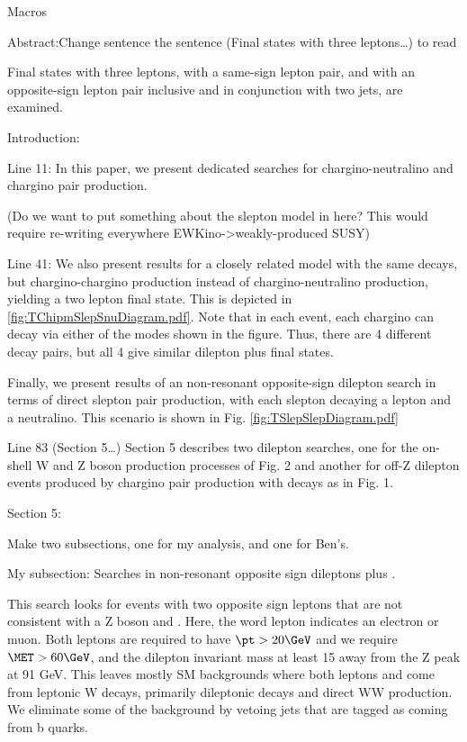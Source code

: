 Macros
\newcommand{\mctp}{\ensuremath{M_{\mathrm{CT}\perp}}}

Abstract:Change sentence the sentence (Final states with three leptons…) to read

Final states with three leptons, with a same-sign lepton pair, and with an opposite-sign lepton pair inclusive and in conjunction with two jets, are examined.

Introduction:

Line 11: In this paper, we present dedicated searches for chargino-neutralino and chargino pair production.

(Do we want to put something about the slepton model in here? This would require re-writing everywhere EWKino->weakly-produced SUSY)

Line 41: We also present results for a closely related model with the same decays, but chargino-chargino production instead of chargino-neutralino production, yielding a two lepton final state. This is depicted in \ref{fig:TChipmSlepSnuDiagram.pdf}. Note that in each event, each chargino can decay via either of the modes shown in the figure. Thus, there are 4 different decay pairs, but all 4 give similar dilepton plus \MET final states.

Finally, we present results of an non-resonant opposite-sign dilepton search in terms of direct slepton pair production, with each slepton decaying a lepton and a neutralino. This scenario is shown in Fig. \ref{fig:TSlepSlepDiagram.pdf}

Line 83 (Section 5…) Section 5 describes two dilepton searches, one for the on-shell W and Z boson production processes of Fig. 2 and another for off-Z dilepton events produced by chargino pair production with decays as in Fig. 1.

Section 5:

Make two subsections, one for my analysis, and one for Ben's.

My subsection: Searches in non-resonant opposite sign dileptons plus \MET.

This search looks for events with two opposite sign leptons that are not consistent with a Z boson and \MET. Here, the word lepton indicates an electron or muon. Both leptons are required to have $\pt > 20 \GeV$ and we require $\MET > 60 \GeV$, and the dilepton invariant mass at least 15 \GeV away from the Z peak at 91 GeV. This leaves mostly SM backgrounds where both leptons and \MET come from leptonic W decays, primarily dileptonic \ttbar decays and direct WW production. We eliminate some of the \ttbar background by vetoing jets that are tagged as coming from b quarks.

